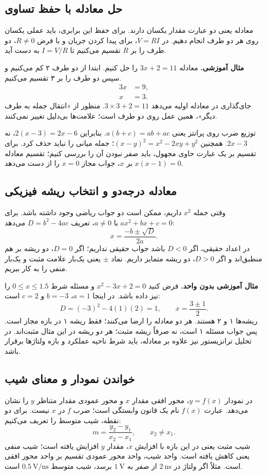 \subsection{حل معادله با حفظ تساوی}
معادله یعنی دو عبارت مقدار یکسان دارند. برای حفظ این برابری، باید عملی یکسان
روی هر دو طرف انجام دهیم. در \(V=RI\)، برای پیدا کردن جریان و با فرض \(R\ne0\)،
دو طرف را بر \(R\) تقسیم می‌کنیم تا \(I=V/R\) به دست آید.

\textbf{مثال آموزشی.} معادله \(3x+2=11\) را حل کنیم. ابتدا از دو طرف ۲ کم
می‌کنیم و سپس دو طرف را بر ۳ تقسیم می‌کنیم.
\[
 \begin{aligned}
 3x&=9,\\
 x&=3.
 \end{aligned}
\]
جای‌گذاری در معادله اولیه می‌دهد \(3\times3+2=11\).
منظور از «انتقال جمله به طرف دیگر»، همین عمل روی دو طرف است؛ علامت‌ها بی‌دلیل تغییر نمی‌کنند.

توزیع ضرب روی پرانتز یعنی \(a(b+c)=ab+ac\).
بنابراین \(2(x-3)=2x-6\)، نه \(2x-3\).
همچنین \((x-y)^2=x^2-2xy+y^2\)؛ جمله میانی را نباید حذف کرد.
برای تقسیم بر یک عبارت حاوی مجهول، باید صفر نبودن آن را بررسی کنیم؛
تقسیم معادله \(x(x-1)=0\) بر \(x\)، جواب مجاز \(x=0\) را از دست می‌دهد.

\subsection{معادله درجه‌دو و انتخاب ریشه فیزیکی}
وقتی جمله \(x^2\) داریم، ممکن است دو جواب ریاضی وجود داشته باشد.
برای \(ax^2+bx+c=0\) با \(a\ne0\)، تعریف \(D=b^2-4ac\) می‌دهد:
\begin{equation}\label{eq:foundation-quadratic}
x=\frac{-b\pm\sqrt{D}}{2a}.
\end{equation}
در اعداد حقیقی، اگر \(D<0\) باشد جواب حقیقی نداریم؛ اگر \(D=0\)،
دو ریشه بر هم منطبق‌اند و اگر \(D>0\)، دو ریشه متمایز داریم.
نماد \(\pm\) یعنی یک‌بار علامت مثبت و یک‌بار منفی را به کار ببریم.

\textbf{مثال آموزشی بدون واحد.} فرض کنید \(x^2-3x+2=0\) و مسئله شرط
\(0\le x\le1.5\) را نیز داده باشد. در اینجا \(a=1\)، \(b=-3\) و \(c=2\) است:
\[
D=(-3)^2-4(1)(2)=1,\qquad
x=\frac{3\pm1}{2}.
\]
ریشه‌ها ۱ و ۲ هستند. هر دو معادله را ارضا می‌کنند؛ فقط ریشه ۱ در بازه مجاز است.
پس جواب مسئله ۱ است، نه صرفاً ریشه مثبت؛ هر دو ریشه در این مثال مثبت‌اند.
در تحلیل ترانزیستور نیز علاوه بر معادله، باید شرط ناحیه عملکرد و بازه ولتاژها برقرار باشد.

\subsection{خواندن نمودار و معنای شیب}
در نمودار \(y=f(x)\)، محور افقی مقدار \(x\) و محور عمودی مقدار متناظر \(y\)
را نشان می‌دهد. عبارت \(f(x)\) نام یک قانون وابستگی است؛ ضرب \(f\) در \(x\) نیست.
برای دو نقطه، شیب متوسط را تعریف می‌کنیم:
\begin{equation}\label{eq:foundation-slope}
m=\frac{y_2-y_1}{x_2-x_1},\qquad x_2\ne x_1.
\end{equation}
شیب مثبت یعنی در این بازه با افزایش \(x\)، مقدار \(y\) افزایش یافته است؛
شیب منفی یعنی کاهش یافته است. واحد شیب، واحد محور عمودی تقسیم بر واحد محور افقی است.
مثلاً اگر ولتاژ در \(\qty{2}{\nano\second}\) از صفر به \(\qty{1}{\volt}\) برسد،
شیب متوسط \(\qty{0.5}{\volt\per\nano\second}\) است.

